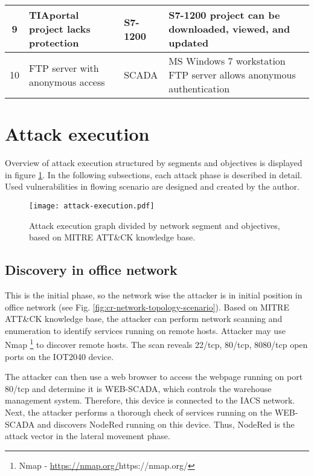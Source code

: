 \begin{longtable}[c]{|c|p{}|p{}|p{}|}
	9            & TIAportal project lacks protection                & S7-1200                 & S7-1200 project can be downloaded, viewed, and updated                                                                                \\ \hline
	10           & FTP server with anonymous access                    & SCADA                   & MS Windows 7 workstation FTP server allows anonymous authentication                                                                   \\ \hline
\end{longtable}


\section{Attack execution} \label{sec:attack-execution}


Overview of attack execution structured by segments and objectives is displayed in figure \ref{fig:atack-exec}. In the following subsections, each attack phase is described in detail. Used vulnerabilities in flowing scenario are designed and created by the author.



\begin{figure}[htb]
	\texttt{[image: attack-execution.pdf]}
	\caption{Attack execution graph divided by network segment and objectives, based on MITRE ATT\&CK knowledge base.}
	\label{fig:atack-exec}
\end{figure}


\subsection{Discovery in office network}

This is the initial phase, so the network wise the attacker is in initial position in office network (see Fig. \ref{fig:cr-network-topology-scenario}). Based on MITRE ATT\&CK knowledge base, the attacker can perform network scanning and enumeration to identify services running on remote hosts. Attacker may use Nmap \footnote{Nmap - \url{https://nmap.org/}{https://nmap.org/}} to discover remote hosts. The scan reveals 22/tcp, 80/tcp, 8080/tcp open ports on the IOT2040 device. 

The attacker can then use a web browser to access the webpage running on port 80/tcp and determine it is WEB-SCADA, which controls the warehouse management system. Therefore, this device is connected to the IACS network. Next, the attacker performs a thorough check of services running on the WEB-SCADA and discovers NodeRed running on this device. Thus, NodeRed is the attack vector in the lateral movement phase.

